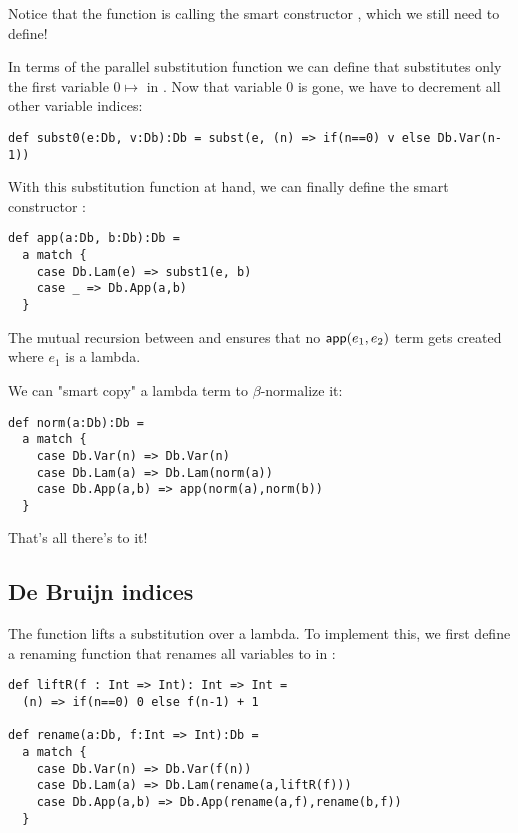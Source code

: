 Notice that the  function is calling the smart constructor , which we still need to define!

In terms of the parallel substitution function  we can define  that substitutes only the first variable $0 \mapsto$  in .
Now that variable $0$ is gone, we have to decrement all other variable indices:

\begin{lstlisting}
def subst0(e:Db, v:Db):Db = subst(e, (n) => if(n==0) v else Db.Var(n-1))
\end{lstlisting}

With this substitution function at hand, we can finally define the smart constructor :

\begin{lstlisting}
def app(a:Db, b:Db):Db =
  a match {
    case Db.Lam(e) => subst1(e, b)
    case _ => Db.App(a,b)
  }
\end{lstlisting}

The mutual recursion between  and  ensures that no $\mathsf{app}(e_1,e_2)$ term gets created where $e_1$ is a lambda.

We can "smart copy" a lambda term to $\beta$-normalize it:

\begin{lstlisting}
def norm(a:Db):Db =
  a match {
    case Db.Var(n) => Db.Var(n)
    case Db.Lam(a) => Db.Lam(norm(a))
    case Db.App(a,b) => app(norm(a),norm(b))
  }
\end{lstlisting}

That's all there's to it!

\subsection{De Bruijn indices}

The  function lifts a substitution over a lambda.
To implement this, we first define a renaming function  that renames all variables  to  in :

\begin{lstlisting}
def liftR(f : Int => Int): Int => Int =
  (n) => if(n==0) 0 else f(n-1) + 1

def rename(a:Db, f:Int => Int):Db =
  a match {
    case Db.Var(n) => Db.Var(f(n))
    case Db.Lam(a) => Db.Lam(rename(a,liftR(f)))
    case Db.App(a,b) => Db.App(rename(a,f),rename(b,f))
  }
\end{lstlisting}

